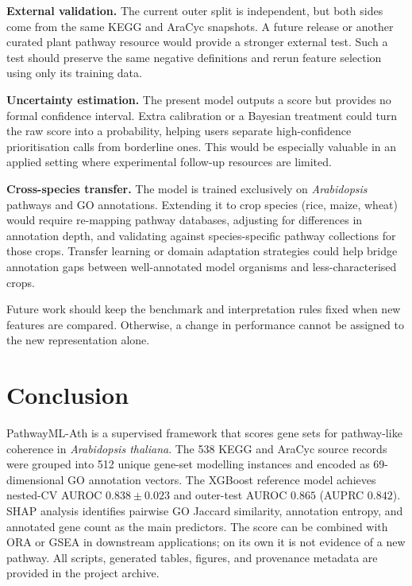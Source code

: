 \documentclass[12pt,twoside]{article}
\begin{document}
\textbf{External validation.} The current outer split is independent, but both sides come from the same KEGG and AraCyc snapshots. A future release or another curated plant pathway resource would provide a stronger external test. Such a test should preserve the same negative definitions and rerun feature selection using only its training data.

\textbf{Uncertainty estimation.} The present model outputs a score but provides no formal confidence interval. Extra calibration or a Bayesian treatment could turn the raw score into a probability, helping users separate high-confidence prioritisation calls from borderline ones. This would be especially valuable in an applied setting where experimental follow-up resources are limited.

\textbf{Cross-species transfer.} The model is trained exclusively on \textit{Arabidopsis} pathways and GO annotations. Extending it to crop species (rice, maize, wheat) would require re-mapping pathway databases, adjusting for differences in annotation depth, and validating against species-specific pathway collections for those crops. Transfer learning or domain adaptation strategies could help bridge annotation gaps between well-annotated model organisms and less-characterised crops.

Future work should keep the benchmark and interpretation rules fixed when new features are compared. Otherwise, a change in performance cannot be assigned to the new representation alone.


\section{Conclusion}
\label{sec:conclusion}

PathwayML-Ath is a supervised framework that scores gene sets for pathway-like coherence in \textit{Arabidopsis thaliana}. The 538 KEGG and AraCyc source records were grouped into 512 unique gene-set modelling instances and encoded as 69-dimensional GO annotation vectors. The XGBoost reference model achieves nested-CV AUROC $0.838 \pm 0.023$ and outer-test AUROC $0.865$ (AUPRC $0.842$). SHAP analysis identifies pairwise GO Jaccard similarity, annotation entropy, and annotated gene count as the main predictors. The score can be combined with ORA or GSEA in downstream applications; on its own it is not evidence of a new pathway. All scripts, generated tables, figures, and provenance metadata are provided in the project archive.
\end{document}
